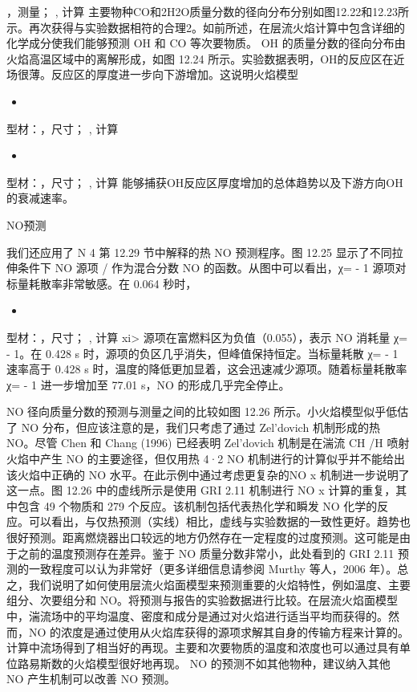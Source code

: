 \documentclass[11pt,a4paper,openany,fontset=none]{ctexbook}
\begin{document}
，测量； , 计算
主要物种CO和2H2O质量分数的径向分布分别如图12.22和12.23所示。再次获得与实验数据相符的合理2。如前所述，在层流火焰计算中包含详细的化学成分使我们能够预测 OH 和 CO 等次要物质。 OH 的质量分数的径向分布由火焰高温区域中的离解形成，如图 12.24 所示。实验数据表明，OH的反应区在近场很薄。反应区的厚度进一步向下游增加。这说明火焰模型

\begin{itemize}

\item 

\end{itemize}

型材：，尺寸； , 计算

\begin{itemize}

\item 

\end{itemize}

型材：，尺寸； , 计算
能够捕获OH反应区厚度增加的总体趋势以及下游方向OH的衰减速率。

NO预测

我们还应用了 N 4 第 12.29 节中解释的热 NO 预测程序。图 12.25 显示了不同拉伸条件下 NO 源项 / 作为混合分数 NO 的函数。从图中可以看出，χ= - 1 源项对标量耗散率非常敏感。在 0.064 秒时，

\begin{itemize}

\item 

\end{itemize}

型材：，尺寸； , 计算
xi> 源项在富燃料区为负值（0.055），表示 NO 消耗量 χ= - 1。在 0.428 s 时，源项的负区几乎消失，但峰值保持恒定。当标量耗散 χ= - 1 速率高于 0.428 s 时，温度的降低更加显着，这会迅速减少源项。随着标量耗散率 χ= - 1 进一步增加至 77.01 s，NO 的形成几乎完全停止。

NO 径向质量分数的预测与测量之间的比较如图 12.26 所示。小火焰模型似乎低估了 NO 分布，但应该注意的是，我们只考虑了通过 Zel'dovich 机制形成的热 NO。尽管 Chen 和 Chang (1996) 已经表明 Zel'dovich 机制是在湍流 CH /H 喷射火焰中产生 NO 的主要途径，但仅用热 4·2 NO 机制进行的计算似乎并不能给出该火焰中正确的 NO 水平。在此示例中通过考虑更复杂的NO x 机制进一步说明了这一点。图 12.26 中的虚线所示是使用 GRI 2.11 机制进行 NO x 计算的重复，其中包含 49 个物质和 279 个反应。该机制包括代表热化学和瞬发 NO 化学的反应。可以看出，与仅热预测（实线）相比，虚线与实验数据的一致性更好。趋势也很好预测。距离燃烧器出口较远的地方仍然存在一定程度的过度预测。这可能是由于之前的温度预测存在差异。鉴于 NO 质量分数非常小，此处看到的 GRI 2.11 预测的一致程度可以认为非常好（更多详细信息请参阅 Murthy 等人，2006 年）。总之，我们说明了如何使用层流火焰面模型来预测重要的火焰特性，例如温度、主要组分、次要组分和 NO。将预测与报告的实验数据进行比较。在层流火焰面模型中，湍流场中的平均温度、密度和成分是通过对火焰进行适当平均而获得的。然而，NO 的浓度是通过使用从火焰库获得的源项求解其自身的传输方程来计算的。计算中流场得到了相当好的再现。主要和次要物质的温度和浓度也可以通过具有单位路易斯数的火焰模型很好地再现。 NO 的预测不如其他物种，建议纳入其他 NO 产生机制可以改善 NO 预测。
\end{document}
